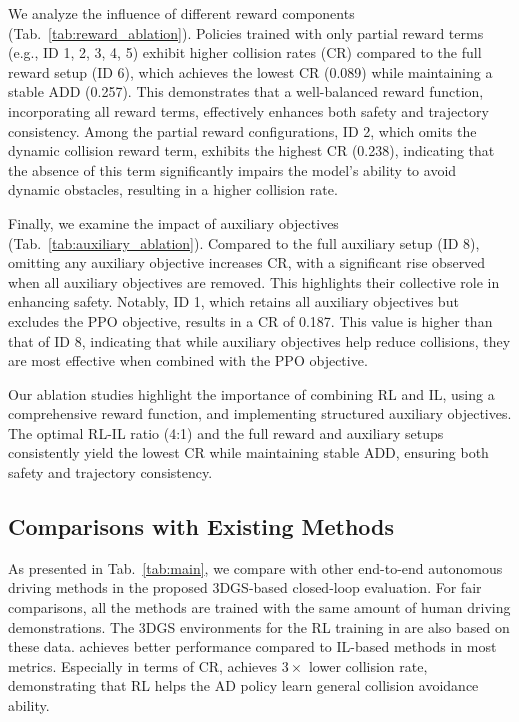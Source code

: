 We analyze the influence of different reward components (Tab.~\ref{tab:reward_ablation}). Policies trained with only partial reward terms (e.g., ID 1, 2, 3, 4, 5) exhibit higher collision rates (CR) compared to the full reward setup (ID 6), which achieves the lowest CR (0.089) while maintaining a stable ADD (0.257). This demonstrates that a well-balanced reward function, incorporating all reward terms, effectively enhances both safety and trajectory consistency. Among the partial reward configurations, ID 2, which omits the dynamic collision reward term, exhibits the highest CR (0.238), indicating that the absence of this term significantly impairs the model's ability to avoid dynamic obstacles, resulting in a higher collision rate.

Finally, we examine the impact of auxiliary objectives (Tab.~\ref{tab:auxiliary_ablation}). Compared to the full auxiliary setup (ID 8), omitting any auxiliary objective increases CR, with a significant rise observed when all auxiliary objectives are removed. This highlights their collective role in enhancing safety. Notably, ID 1, which retains all auxiliary objectives but excludes the PPO objective, results in a CR of 0.187. This value is higher than that of ID 8, indicating that while auxiliary objectives help reduce collisions, they are most effective when combined with the PPO objective.

Our ablation studies highlight the importance of combining RL and IL, using a comprehensive reward function, and implementing structured auxiliary objectives. The optimal RL-IL ratio (4:1) and the full reward and auxiliary setups consistently yield the lowest CR while maintaining stable ADD, ensuring both safety and trajectory consistency.

\subsection{Comparisons with Existing Methods}
As presented in Tab.~\ref{tab:main}, we compare \thename{} with other end-to-end autonomous driving methods in the proposed 3DGS-based closed-loop evaluation. For fair comparisons, all the methods are trained with the same amount of human driving demonstrations. The 3DGS environments for the RL training in \thename{} are also based on these data.
\thename{} achieves better performance compared to IL-based methods in most metrics. Especially in terms of CR, \thename{} achieves $3\times$ lower collision rate, demonstrating that RL helps the AD policy learn general collision avoidance ability.


